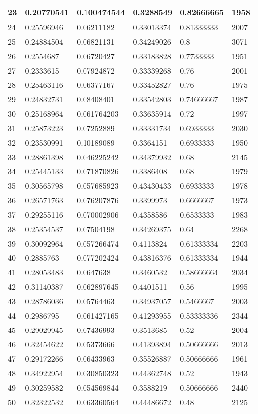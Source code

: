 \begin{longtable}{|l|l|l|l|l|l|}
23 & 0.20770541 & 0.100474544 & 0.3288549 & 0.82666665 & 1958 \\ \hline 
24 & 0.25596946 & 0.06211182 & 0.33013374 & 0.81333333 & 2007 \\ \hline 
25 & 0.24884504 & 0.06821131 & 0.34249026 & 0.8 & 3071 \\ \hline 
26 & 0.2554687 & 0.06720427 & 0.33183828 & 0.7733333 & 1951 \\ \hline 
27 & 0.2333615 & 0.07924872 & 0.33339268 & 0.76 & 2001 \\ \hline 
28 & 0.25463116 & 0.06377167 & 0.33452827 & 0.76 & 1975 \\ \hline 
29 & 0.24832731 & 0.08408401 & 0.33542803 & 0.74666667 & 1987 \\ \hline 
30 & 0.25168964 & 0.061764203 & 0.33635914 & 0.72 & 1997 \\ \hline 
31 & 0.25873223 & 0.07252889 & 0.33331734 & 0.6933333 & 2030 \\ \hline 
32 & 0.23530991 & 0.10189089 & 0.3364151 & 0.6933333 & 1950 \\ \hline 
33 & 0.28861398 & 0.046225242 & 0.34379932 & 0.68 & 2145 \\ \hline 
34 & 0.25445133 & 0.071870826 & 0.3386408 & 0.68 & 1979 \\ \hline 
35 & 0.30565798 & 0.057685923 & 0.43430433 & 0.6933333 & 1978 \\ \hline 
36 & 0.26571763 & 0.076207876 & 0.3399973 & 0.6666667 & 1973 \\ \hline 
37 & 0.29255116 & 0.070002906 & 0.4358586 & 0.6533333 & 1983 \\ \hline 
38 & 0.25354537 & 0.07504198 & 0.34269375 & 0.64 & 2268 \\ \hline 
39 & 0.30092964 & 0.057266474 & 0.4113824 & 0.61333334 & 2203 \\ \hline 
40 & 0.2885763 & 0.077202424 & 0.43816376 & 0.61333334 & 1944 \\ \hline 
41 & 0.28053483 & 0.0647638 & 0.3460532 & 0.58666664 & 2034 \\ \hline 
42 & 0.31140387 & 0.062897645 & 0.4401511 & 0.56 & 1995 \\ \hline 
43 & 0.28786036 & 0.05764463 & 0.34937057 & 0.5466667 & 2003 \\ \hline 
44 & 0.2986795 & 0.061427165 & 0.41293955 & 0.53333336 & 2344 \\ \hline 
45 & 0.29029945 & 0.07436993 & 0.3513685 & 0.52 & 2004 \\ \hline 
46 & 0.32454622 & 0.05373666 & 0.41393894 & 0.50666666 & 2013 \\ \hline 
47 & 0.29172266 & 0.06433963 & 0.35526887 & 0.50666666 & 1961 \\ \hline 
48 & 0.34922954 & 0.030850323 & 0.44362748 & 0.52 & 1943 \\ \hline 
49 & 0.30259582 & 0.054569844 & 0.3588219 & 0.50666666 & 2440 \\ \hline 
50 & 0.32322532 & 0.063360564 & 0.44486672 & 0.48 & 2125 \\ \hline 
\end{longtable}